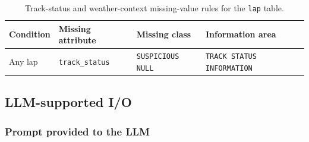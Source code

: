 \documentclass[11pt,a4paper]{article}
\begin{document}
	
	\vspace{2em}
	\begin{table}[H]
		\centering
		\small
		\caption{Track-status and weather-context missing-value rules for the \texttt{lap} table.}
		\label{tab:appendix-lap-context-missing-rules}
		\begin{tabularx}{\linewidth}{p{4cm}p{3.6cm}p{3.2cm}X}
			\toprule
			\textbf{Condition}
			& \textbf{Missing attribute}
			& \textbf{Missing class}
			& \textbf{Information area} \\
			\midrule
			

			Any lap
			& \texttt{track\_status}
			& \texttt{SUSPICIOUS NULL}
			& \texttt{TRACK STATUS INFORMATION} \\
			
		
			\bottomrule
		\end{tabularx}

		
	\end{table}


	\newpage
		
	\subsection{LLM-supported I/O}
	\label{appendix:llm-dqa-interpretation}
	
	\vspace{3em}
	
	\subsubsection*{Prompt provided to the LLM}
	
	\vspace{4em}

	
	
\end{document}
